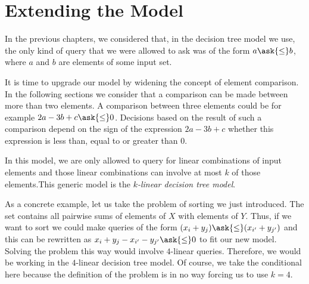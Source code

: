 \section{Extending the Model}

In the previous chapters, we considered that, in the decision tree
model we use, the only kind of query that we were allowed to ask was of the
form \(a \ask{\le} b \), where \(a\) and \(b\) are elements of some input set.

It is time to upgrade our model by widening the concept of element
comparison. In the following sections we consider that a comparison can be made
between more than two elements. A comparison between three elements could be
for example \(2a - 3b + c \ask{\le} 0\). Decisions based on the result of such
a comparison depend on the sign of the expression \(2a - 3b + c\) \ie whether
this expression is less than, equal to or greater than \(0\).

In this model, we are only allowed to query for linear combinations of
input elements and those linear combinations can involve at most \(k\) of those
elements.This generic model is the \emph{\(k\)-linear decision tree
model}.

As a concrete example, let us take the problem of sorting \XY we just introduced.
The set \XY contains all pairwise sums of elements of \(X\) with elements of
\(Y\). Thus, if we want to sort \XY we could make queries of the form \((x_i +
y_j) \ask{\le} (x_{i'} + y_{j'})\) and this can be rewritten as \( x_i +
y_j - x_{i'} - y_{j'} \ask{\le} 0\) to fit our new model. Solving the problem
this way would involve \(4\)-linear queries. Therefore, we would be working in
the \(4\)-linear decision tree model. Of course, we take the conditional here
because the definition of the problem is in no way forcing us to use \(k=4\).
